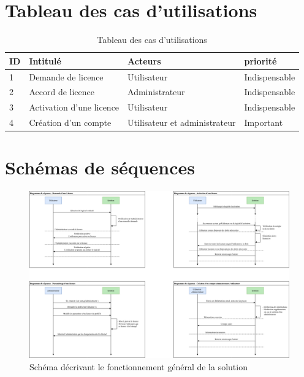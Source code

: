 \section{Tableau des cas d'utilisations}

\begin{table}[h]
	\centering
	\begin{tabular}{ | m{0.6cm} | m{6cm} | m{6cm}| m{3cm} | } 
                \hline
		\textbf{ID} & \textbf{Intitulé} & \textbf{Acteurs} & \textbf{priorité} \\
                \hline
			1 & Demande de licence & Utilisateur & Indispensable \\
                \hline
			2 & Accord de licence & Administrateur & Indispensable \\
                \hline
			3 & Activation d'une licence & Utilisateur & Indispensable \\
		\hline
			4 & Création d'un compte & Utilisateur et administrateur & Important \\
		\hline
        \end{tabular}
	\caption{Tableau des cas d'utilisations}
	\label{tab:tab1}
\end{table}
\newpage

\section{Schémas de séquences}

\begin{figure}[h]
	\centering
	\includegraphics[width=16cm]{main/Seq.png}
	\caption{Schéma décrivant le fonctionnement général de la solution}
	\label{fig:fig3}
\end{figure}

